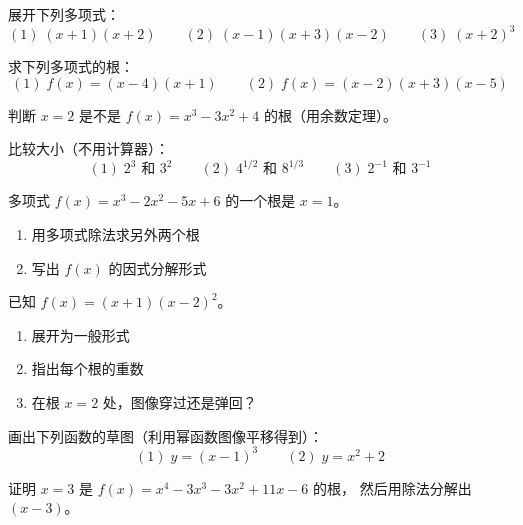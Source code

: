 
\begin{exercise}[2]
展开下列多项式：
\[
(1)\; (x+1)(x+2) \qquad
(2)\; (x-1)(x+3)(x-2) \qquad
(3)\; (x+2)^3
\]
\end{exercise}

\begin{exercise}[2]
求下列多项式的根：
\[
(1)\; f(x) = (x-4)(x+1) \qquad
(2)\; f(x) = (x-2)(x+3)(x-5)
\]
\end{exercise}

\begin{exercise}[2]
判断 \(x=2\) 是不是 \(f(x) = x^3 - 3x^2 + 4\) 的根（用余数定理）。
\end{exercise}

\begin{exercise}[2]
比较大小（不用计算器）：
\[
(1)\; 2^3 \text{ 和 } 3^2 \qquad
(2)\; 4^{1/2} \text{ 和 } 8^{1/3} \qquad
(3)\; 2^{-1} \text{ 和 } 3^{-1}
\]
\end{exercise}


\begin{exercise}[3]
多项式 \(f(x) = x^3 - 2x^2 - 5x + 6\) 的一个根是 \(x=1\)。
\begin{enumerate}
  \item[(1)] 用多项式除法求另外两个根
  \item[(2)] 写出 \(f(x)\) 的因式分解形式
\end{enumerate}
\end{exercise}

\begin{exercise}[3]
已知 \(f(x) = (x+1)(x-2)^2\)。
\begin{enumerate}
  \item[(1)] 展开为一般形式
  \item[(2)] 指出每个根的重数
  \item[(3)] 在根 \(x=2\) 处，图像穿过还是弹回？
\end{enumerate}
\end{exercise}

\begin{exercise}[3]
画出下列函数的草图（利用幂函数图像平移得到）：
\[
(1)\; y = (x-1)^3 \qquad
(2)\; y = x^2 + 2
\]
\end{exercise}

\begin{exercise}[3]
证明 \(x=3\) 是 \(f(x) = x^4 - 3x^3 - 3x^2 + 11x - 6\) 的根，
然后用除法分解出 \((x-3)\)。
\end{exercise}

